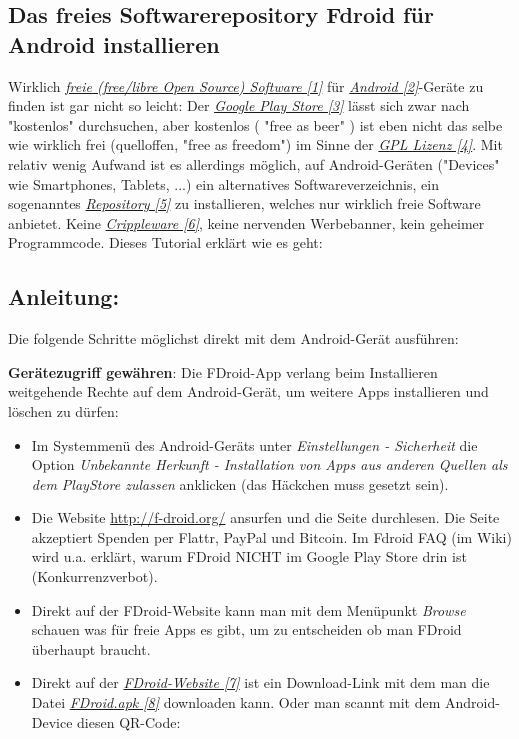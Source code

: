 \documentclass[10pt,a4paper,ngerman,twoside]{article} %
\begin{document}
\begin{multicols}{3}
\subsection*{Das freies Softwarerepository Fdroid für Android installieren}

Wirklich \href{http://de.wikipedia.org/wiki/Freie_Software}{\textit{freie (free/libre Open Source) Software [1]}} für \href{http://www.android.com/}{\textit{Android [2]}}-Geräte zu finden ist gar nicht so leicht: Der \href{https://play.google.com/store}{\textit{Google Play Store [3]}} lässt sich zwar nach "kostenlos" durchsuchen, aber kostenlos ( "free as beer" ) ist eben nicht das selbe wie wirklich frei (quelloffen, "free as freedom") im Sinne der \href{http://de.wikipedia.org/wiki/GNU_General_Public_License}{\textit{GPL Lizenz [4]}}. Mit relativ wenig Aufwand ist es allerdings möglich, auf Android-Geräten ("Devices" wie Smartphones, Tablets, ...) ein alternatives Softwareverzeichnis, ein sogenanntes \href{http://de.wikipedia.org/wiki/Repository}{\textit{Repository [5]}} zu installieren, welches nur wirklich freie Software anbietet. Keine \href{http://de.wikipedia.org/wiki/Crippleware}{\textit{Crippleware [6]}}, keine nervenden Werbebanner, kein geheimer Programmcode. Dieses Tutorial erklärt wie es geht:


\subsection*{Anleitung:}
Die folgende Schritte möglichst direkt mit dem Android-Gerät ausführen:

\textbf{Gerätezugriff gewähren}: Die FDroid-App verlang beim Installieren weitgehende Rechte auf dem Android-Gerät, um weitere Apps installieren und löschen zu dürfen:

\begin{itemize}
\item Im Systemmenü des Android-Geräts unter \emph{Einstellungen - Sicherheit} die Option \emph{Unbekannte Herkunft - Installation von Apps aus anderen Quellen als dem PlayStore zulassen} anklicken (das Häckchen muss gesetzt sein).
\item Die Website \url{http://f-droid.org/} ansurfen und die Seite durchlesen. Die Seite akzeptiert Spenden per Flattr, PayPal und Bitcoin. Im Fdroid FAQ (im Wiki) wird u.a. erklärt, warum FDroid NICHT im Google Play Store drin ist (Konkurrenzverbot).
\item Direkt auf der FDroid-Website kann man mit dem Menüpunkt \emph{Browse} schauen was für freie Apps es gibt, um zu entscheiden ob man FDroid überhaupt braucht.
\item Direkt auf der \href{http://f-droid.org/}{\textit{FDroid-Website [7]}} ist ein Download-Link mit dem man die Datei \href{http://f-droid.org/FDroid.apk}{\textit{FDroid.apk [8]}} downloaden kann. Oder man scannt mit dem Android-Device diesen QR-Code:


\end{itemize}
\end{multicols}
\end{document}
